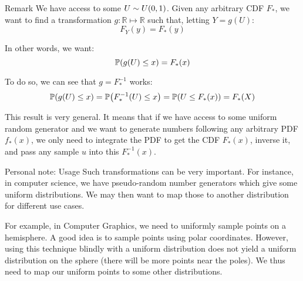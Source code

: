 \documentclass[a4paper]{article}
\begin{document}
\begin{parag}{Remark}
    We have access to some $U \followsdistr U\left(0, 1\right)$. Given any arbitrary CDF $F_*$, we want to find a transformation $g: \mathbb{R}\mapsto \mathbb{R}$ such that, letting $Y = g\left(U\right)$: 
    \[F_Y\left(y\right) = F_*\left(y\right)\]

   In other words, we want: 
   \[\prob\left(g\left(U\right) \leq x\right) = F_*\left(x\right)\]
   
   To do so, we can see that $g = F_*^{-1}$ works: 
   \[\prob\left(g\left(U\right) \leq x\right) = \prob\left(F_*^{-1}\left(U\right) \leq x\right) = \prob\left(U \leq F_*\left(x\right)\right) = F_*\left(X\right)\]

   This result is very general. It means that if we have access to some uniform random generator and we want to generate numbers following any arbitrary PDF $f_*\left(x\right)$, we only need to integrate the PDF to get the CDF $F_*\left(x\right)$, inverse it, and pass any sample $u$ into this $F_*^{-1}\left(x\right)$.
   
    \begin{subparag}{Personal note: Usage}
        Such transformations can be very important. For instance, in computer science, we have pseudo-random number generators which give some uniform distributions. We may then want to map those to another distribution for different use cases.

        For example, in Computer Graphics, we need to uniformly sample points on a hemisphere. A good idea is to sample points using polar coordinates. However, using this technique blindly with a uniform distribution does not yield a uniform distribution on the sphere (there will be more points near the poles). We thus need to map our uniform points to some other distributions.
    \end{subparag}
\end{parag}
\end{document}
